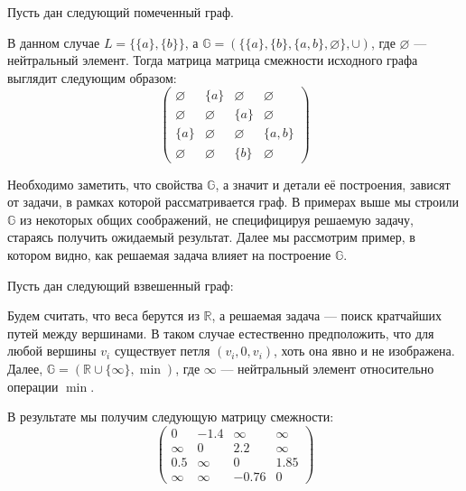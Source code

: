 \begin{example}
  Пусть дан следующий помеченный граф.
  \begin{center}
    
  \end{center}

  В данном случае $L = \{\{a\},\{b\}\}$, а $\mathbb{G} = ( \{\{a\},\{b\},\{a,b\},\varnothing\} ,\cup)$, где $\varnothing$ --- нейтральный элемент.
  Тогда матрица матрица смежности исходного графа выглядит следующим образом:
  $$
  \begin{pmatrix}
    \varnothing   & \{a\}       & \varnothing & \varnothing \\
    \varnothing   & \varnothing & \{a\}       & \varnothing \\
    \{a\}         & \varnothing & \varnothing & \{a,b\} \\
    \varnothing   & \varnothing & \{b\}       & \varnothing
  \end{pmatrix}
  $$
\end{example}

Необходимо заметить, что свойства $\mathbb{G}$, а значит и детали её построения, зависят от задачи, в рамках которой рассматривается граф. В примерах выше мы строили $\mathbb{G}$ из некоторых общих соображений, не специфицируя решаемую задачу, стараясь получить ожидаемый результат. Далее мы рассмотрим пример, в котором видно, как решаемая задача влияет на построение $\mathbb{G}$.

\begin{example}\label{example:apspGraph}
  Пусть дан следующий взвешенный граф:
  \begin{center}
    
  \end{center}

  Будем считать, что веса берутся из $\mathbb{R}$, а решаемая задача --- поиск кратчайших путей между вершинами. В таком случае естественно предположить, что для любой вершины $v_i$ существует петля $(v_i,0,v_i)$, хоть она явно и не изображена. Далее, $\mathbb{G} = ( \mathbb{R}\cup \{\infty\} , \min)$, где $\infty$ --- нейтральный элемент относительно операции $\min$. 

  В результате мы получим следующую матрицу смежности:
  $$
  \begin{pmatrix}
    0 & -1.4 & \infty & \infty \\
    \infty & 0 & 2.2 & \infty \\
    0.5 & \infty & 0 & 1.85 \\
    \infty & \infty & -0.76 & 0
  \end{pmatrix}
  $$
\end{example}

